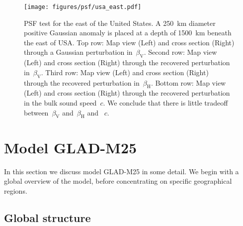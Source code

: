 \documentclass[extra,mreferee]{gji}
\begin{document}
\begin{figure}
  \centering
  \texttt{[image: figures/psf/usa\_east.pdf]}
  \caption{\small{PSF test for the east of the United States.
    A 250~km diameter positive Gaussian anomaly is placed at a depth of 1500~km beneath the east of USA.
  Top row: Map view (Left) and cross section (Right) through a Gaussian perturbation in~$\beta_\mathrm{V}$.
  Second row: Map view (Left) and cross section (Right) through the recovered perturbation in~$\beta_\mathrm{V}$.
  Third row: Map view (Left) and cross section (Right) through the recovered perturbation in~$\beta_\mathrm{H}$.
  Bottom row: Map view (Left) and cross section (Right) through the recovered perturbation in the bulk sound speed~$c$. We conclude that there is little tradeoff between~$\beta_\mathrm{V}$ and~$\beta_\mathrm{H}$ and ~$c$.
  }}
  \label{fig:psf_usa_east}
\end{figure}


\section{Model GLAD-M25}
\label{section:model}

In this section we discuss model GLAD-M25 in some detail.
We begin with a global overview of the model, before concentrating on
specific geographical regions.

\subsection{Global structure}
\end{document}
